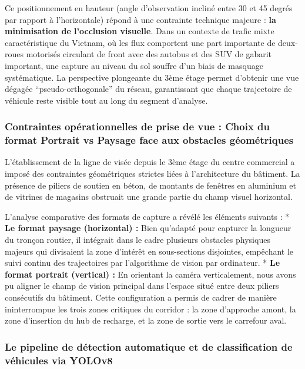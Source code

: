 \documentclass[11pt, a4paper]{article}
\begin{document}
Ce positionnement en hauteur (angle d'observation incliné entre 30 et 45
degrés par rapport à l'horizontale) répond à une contrainte technique
majeure : \textbf{la minimisation de l'occlusion visuelle}. Dans un
contexte de trafic mixte caractéristique du Vietnam, où les flux
comportent une part importante de deux-roues motorisés circulant de
front avec des autobus et des SUV de gabarit important, une capture au
niveau du sol souffre d'un biais de masquage systématique. La
perspective plongeante du 3ème étage permet d'obtenir une vue dégagée
``pseudo-orthogonale'' du réseau, garantissant que chaque trajectoire de
véhicule reste visible tout au long du segment d'analyse.

\subsubsection{Contraintes opérationnelles de prise de vue : Choix du
format Portrait vs Paysage face aux obstacles
géométriques}\label{contraintes-opuxe9rationnelles-de-prise-de-vue-choix-du-format-portrait-vs-paysage-face-aux-obstacles-guxe9omuxe9triques}

L'établissement de la ligne de visée depuis le 3ème étage du centre
commercial a imposé des contraintes géométriques strictes liées à
l'architecture du bâtiment. La présence de piliers de soutien en béton,
de montants de fenêtres en aluminium et de vitrines de magasins
obstruait une grande partie du champ visuel horizontal.

L'analyse comparative des formats de capture a révélé les éléments
suivants : * \textbf{Le format paysage (horizontal) :} Bien qu'adapté
pour capturer la longueur du tronçon routier, il intégrait dans le cadre
plusieurs obstacles physiques majeurs qui divisaient la zone d'intérêt
en sous-sections disjointes, empêchant le suivi continu des trajectoires
par l'algorithme de vision par ordinateur. * \textbf{Le format portrait
(vertical) :} En orientant la caméra verticalement, nous avons pu
aligner le champ de vision principal dans l'espace situé entre deux
piliers consécutifs du bâtiment. Cette configuration a permis de cadrer
de manière ininterrompue les trois zones critiques du corridor : la zone
d'approche amont, la zone d'insertion du hub de recharge, et la zone de
sortie vers le carrefour aval.

\subsubsection{Le pipeline de détection automatique et de classification
de véhicules via
YOLOv8}\label{le-pipeline-de-duxe9tection-automatique-et-de-classification-de-vuxe9hicules-via-yolov8}
\end{document}
